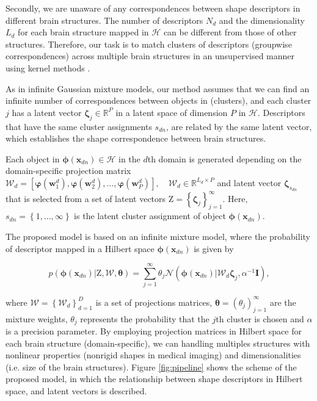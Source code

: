 \documentclass[twoside]{article}
\newcommand{\Z}{\boldsymbol{\mathrm{Z}}}
\newcommand{\indobj}{\mathbf{x}_{dn}}
\newcommand{\projMat}{\boldsymbol{\mathcal{W}}_d}
\newcommand{\lvec}{\boldsymbol{\zeta}_j}
\newcommand{\lvecs}{\boldsymbol{\zeta}_{s_{dn}}}
\newcommand{\phixnd}{\boldsymbol{\phi}\left(\indobj\right)}
\newcommand{\phiwld}[1]{\boldsymbol{\varphi}\left(\mathbf{w}_{#1}^d\right)}
\begin{document}
Secondly, we are unaware of any correspondences between shape descriptors in different brain structures. The number of descriptors $N_d$ and the dimensionality $L_d$ for each brain structure mapped in $\mathcal{H}$ can be different from those of other structures. Therefore, our task is to match clusters of descriptors (groupwise correspondences) across multiple brain structures in an unsupervised manner using kernel methods \cite{Iwata13,Sriperumbudur10}.

As in infinite Gaussian mixture models, our method assumes that we can find an infinite number of correspondences between objects in (clusters), and each cluster $j$ has a latent vector $\lvec\in \mathbb{R}^P$ in a latent space of dimension $P$ in $\mathcal{H}$. Descriptors that have the same cluster assignments $s_{dn}$, are related by the same latent vector, which establishes the shape correspondence between brain structures.


Each object in $\phixnd \in \mathcal{H}$ in the $d$th domain is generated depending on the domain-specific projection matrix $\projMat =\left[\phiwld{1},\phiwld{2},\dots,\phiwld{P}\right],\quad \projMat \in \mathbb{R}^{L_d \times P}$ and latent vector $\lvecs$ that is selected from a set of latent vectors $\Z = \left\{\lvec\right\}_{j=1}^\infty$. Here, $s_{dn}=\left\{1,\dots,\infty\right\}$ is the latent cluster assignment of object $\phixnd$.


The proposed model is based on an infinite mixture model, where the
probability of descriptor mapped in a Hilbert space $\phixnd$ is given by

\begin{equation}
p\left( {{\phixnd}|{\Z},{\boldsymbol{\mathcal{W}}},{\boldsymbol{\theta }}} \right) = \sum\limits_{j = 1}^\infty  {{\theta _j}\mathcal{N}\left(\phixnd|\projMat\lvec,\alpha^{-1}\mathbf{I}\right)}, 
\label{eq:llNLmodel}
\end{equation}

where $\boldsymbol{\mathcal{W}} = \left\{\projMat\right\}_{d=1}^{D}$ is a set of projections
matrices, $\boldsymbol{\theta}=\left(\theta_j\right)_{j=1}^{\infty}$
are the mixture weights, $\theta_j$ represents the probability that
the $j$th cluster is chosen and $\alpha$ is a precision parameter.
By employing projection matrices in Hilbert space for each brain structure (domain-specific), we can
handling multiples structures with nonlinear properties (nonrigid shapes in medical imaging) and dimensionalities (i.e. size of the brain structures). Figure \ref{fig:pipeline} shows the scheme of the proposed model, in which the relationship between shape descriptors in Hilbert space, and latent vectors is described.
\end{document}
